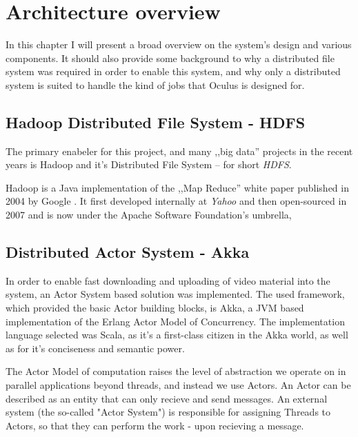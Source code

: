 \chapter{Architecture overview}
In this chapter I will present a broad overview on the system's design and various components.
It should also provide some background to why a distributed file system was required in order to enable this system,
and why only a distributed system is suited to handle the kind of jobs that Oculus is designed for.

\section{Hadoop Distributed File System - HDFS}

The primary enabeler for this project, and many ,,big data'' projects in the recent years is Hadoop and it's Distributed File System -- for short \textit{HDFS}.

Hadoop is a Java implementation of the ,,Map Reduce'' white paper published in 2004 by Google . It first  developed internally at \textit{Yahoo} and then open-sourced in 2007 and is now under the Apache Software Foundation's umbrella, 


\section{Distributed Actor System - Akka}

In order to enable fast downloading and uploading of video material into the system, an Actor System based solution was implemented.
The used framework, which provided the basic Actor building blocks, is Akka, a JVM based implementation of the Erlang Actor Model of Concurrency. The implementation language selected was Scala, as it's a first-class citizen in the Akka world, as well as for it's conciseness and semantic power.


The Actor Model of computation raises the level of abstraction we operate on in parallel applications beyond threads, and instead
we use Actors. An Actor can be described as an entity that can only recieve and send messages. An external system (the so-called "Actor System") is responsible for assigning Threads to Actors, so that they can perform the work - upon recieving a message.

